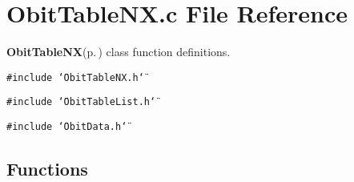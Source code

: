 \section{Obit\-Table\-NX.c File Reference}
\label{ObitTableNX_8c}
{\bf Obit\-Table\-NX}{\rm (p.\,\pageref{structObitTableNX})} class function definitions. 

{\tt \#include \char`\"{}Obit\-Table\-NX.h\char`\"{}}\par
{\tt \#include \char`\"{}Obit\-Table\-List.h\char`\"{}}\par
{\tt \#include \char`\"{}Obit\-Data.h\char`\"{}}\par
\subsection*{Functions}

